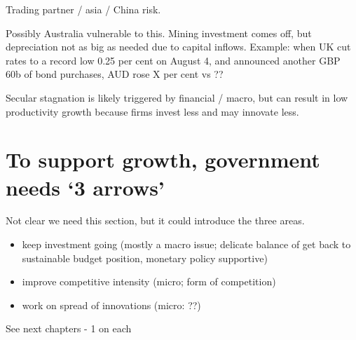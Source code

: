 Trading partner / asia / China risk.

Possibly Australia vulnerable to this. Mining investment comes off, but depreciation not as big as needed due to capital inflows.  Example: when UK cut rates to a record low 0.25 per cent on August 4, and announced another GBP 60b of bond purchases, AUD rose X per cent vs ??

Secular stagnation is likely triggered by financial / macro, but can result in low productivity growth because firms invest less and may innovate less.

\section{To support growth, government needs `3 arrows'}

Not clear we need this section, but it could introduce the three areas.

\begin{itemize}
    \item keep investment going (mostly a macro issue; delicate balance of get back to sustainable budget position, monetary policy supportive)
    \item improve competitive intensity (micro; form of competition)
    \item work on spread of innovations (micro: ??)   
\end{itemize} 

See next chapters - 1 on each